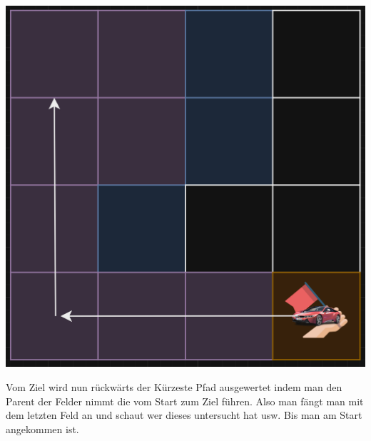{
\begin{minipage}{0.4\linewidth}
  \includegraphics[scale=.125]{Cars/img8.png}
\end{minipage}
\begin{minipage}{0.6\linewidth}
Vom Ziel wird nun rückwärts der Kürzeste Pfad ausgewertet indem man den Parent der Felder nimmt die vom Start zum Ziel führen. Also man fängt man mit dem letzten Feld an und schaut wer dieses untersucht hat usw. Bis man am Start angekommen ist.
\end{minipage}
}





